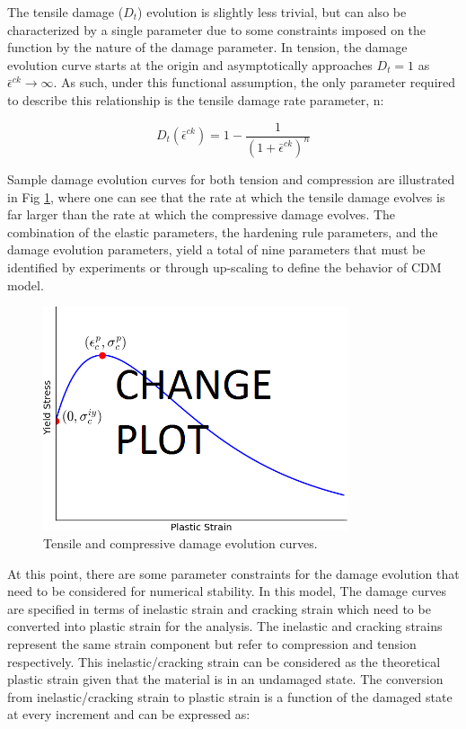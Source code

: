 The tensile damage ($D_{t}$) evolution is slightly less trivial, but can also be characterized by a single parameter due to some constraints imposed on the function by the nature of the damage parameter. In
tension, the damage evolution curve starts at the origin and asymptotically approaches $D_{t}=1$ as $\bar{\epsilon}^{ck}\rightarrow\infty$. As such, under this functional assumption, the only parameter required to describe this relationship is the tensile damage rate parameter, n:

\begin{equation}
D_{t}\left(\bar{\epsilon}^{ck}\right)=1-\frac{1}{\left(1+\bar{\epsilon}^{ck}\right)^{n}}\label{eqn:param4}
\end{equation}

Sample damage evolution curves for both tension and compression are illustrated in Fig \ref{fig:damageCurves}, where one can see that the rate at which the tensile damage evolves is far larger than the rate at which the compressive damage evolves. The combination of the elastic parameters, the hardening rule parameters, and the damage evolution parameters, yield a total of nine parameters that must be identified by experiments or through up-scaling to define the behavior of CDM model.

\begin{figure}[!htb]
\begin{center}
\includegraphics[width=0.8\textwidth]{figures/Chapter3/DamageCurves}
\caption{{\label{fig:damageCurves} Tensile and compressive damage evolution curves.%
}}
\end{center}
\end{figure}

At this point, there are some parameter constraints for the damage evolution that need to be considered for numerical stability. In this model, The damage curves are specified in terms of inelastic strain and cracking strain which need to be converted into plastic strain for the analysis. The inelastic and cracking strains represent the same strain component but refer to compression and tension respectively. This inelastic/cracking strain can be considered as the theoretical plastic strain given that the material is in an undamaged state. The conversion from inelastic/cracking strain to plastic strain is a function of the damaged state at every increment and can be expressed as:


